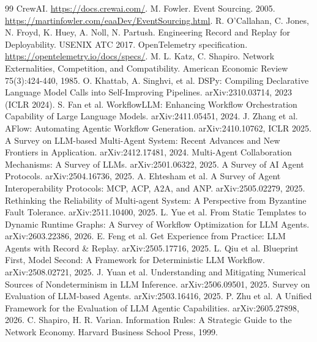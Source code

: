 \documentclass[11pt]{article}
\begin{document}
\begin{thebibliography}{99}
 CrewAI. \url{https://docs.crewai.com/}.
 M. Fowler. Event Sourcing. 2005. \url{https://martinfowler.com/eaaDev/EventSourcing.html}.
 R. O'Callahan, C. Jones, N. Froyd, K. Huey, A. Noll, N. Partush. Engineering Record and Replay for Deployability. USENIX ATC 2017.
 OpenTelemetry specification. \url{https://opentelemetry.io/docs/specs/}.
 M. L. Katz, C. Shapiro. Network Externalities, Competition, and Compatibility. American Economic Review 75(3):424-440, 1985.
 O. Khattab, A. Singhvi, et al. DSPy: Compiling Declarative Language Model Calls into Self-Improving Pipelines. arXiv:2310.03714, 2023 (ICLR 2024).
 S. Fan et al. WorkflowLLM: Enhancing Workflow Orchestration Capability of Large Language Models. arXiv:2411.05451, 2024.
 J. Zhang et al. AFlow: Automating Agentic Workflow Generation. arXiv:2410.10762, ICLR 2025.
 A Survey on LLM-based Multi-Agent System: Recent Advances and New Frontiers in Application. arXiv:2412.17481, 2024.
 Multi-Agent Collaboration Mechanisms: A Survey of LLMs. arXiv:2501.06322, 2025.
 A Survey of AI Agent Protocols. arXiv:2504.16736, 2025.
 A. Ehtesham et al. A Survey of Agent Interoperability Protocols: MCP, ACP, A2A, and ANP. arXiv:2505.02279, 2025.
 Rethinking the Reliability of Multi-agent System: A Perspective from Byzantine Fault Tolerance. arXiv:2511.10400, 2025.
 L. Yue et al. From Static Templates to Dynamic Runtime Graphs: A Survey of Workflow Optimization for LLM Agents. arXiv:2603.22386, 2026.
 E. Feng et al. Get Experience from Practice: LLM Agents with Record \& Replay. arXiv:2505.17716, 2025.
 L. Qiu et al. Blueprint First, Model Second: A Framework for Deterministic LLM Workflow. arXiv:2508.02721, 2025.
 J. Yuan et al. Understanding and Mitigating Numerical Sources of Nondeterminism in LLM Inference. arXiv:2506.09501, 2025.
 Survey on Evaluation of LLM-based Agents. arXiv:2503.16416, 2025.
 P. Zhu et al. A Unified Framework for the Evaluation of LLM Agentic Capabilities. arXiv:2605.27898, 2026.
 C. Shapiro, H. R. Varian. Information Rules: A Strategic Guide to the Network Economy. Harvard Business School Press, 1999.
\end{thebibliography}
\end{document}
